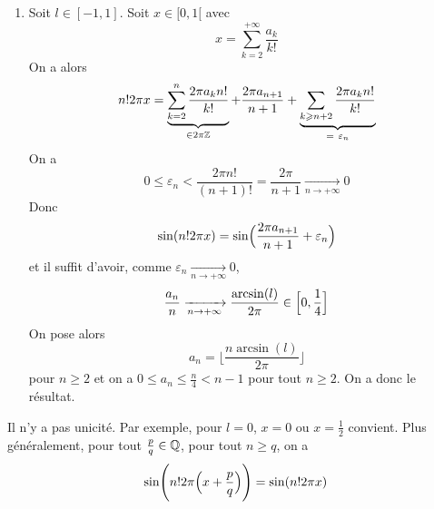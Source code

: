 \begin{solution}
\begin{enumerate}
		\item Soit $l\in[-1,1]$. Soit $x\in[0,1[$ avec 
		$$x=\sum_{k=2}^{+\infty}\frac{a_{k}}{k!}$$
		On a alors 
		$$n!2\pi x=\underbrace{\sum_{k=2}^{n}\frac{2\pi a_{k}n!}{k!}}_{\in 2\pi\mathbb{Z}}+\frac{2\pi a_{n+1}}{n+1}+\underbrace{\sum_{k\geqslant n+2}\frac{2\pi a_{k}n!}{k!}}_{=~\varepsilon_{n}}$$
		On a 
		$$0\leqslant \varepsilon_{n} < \frac{2\pi n!}{(n+1)!}=\frac{2\pi}{n+1}\xrightarrow[n\to+\infty]{}0$$
		Donc 
		$$\sin(n!2\pi x)=\sin\Bigl(\frac{2\pi a_{n+1}}{n+1}+\varepsilon_{n}\Bigr)$$
		et il suffit d'avoir, comme $\varepsilon_{n}\xrightarrow[n\to+\infty]{}0$,
		$$\frac{a_{n}}{n}\xrightarrow[n\to+\infty]{}\frac{\arcsin(l)}{2\pi}\in\Bigl[0,\frac{1}{4}\Bigr]$$
		On pose alors 
		$$\boxed{a_{n}=\Biggl\lfloor\frac{n\arcsin(l)}{2\pi}\Biggr\rfloor}$$
		pour $n\geqslant2$ et on a $0\leqslant a_{n}\leqslant \frac{n}{4}<n-1$ pour tout $n\geqslant2$. On a donc le résultat.
	\end{enumerate}
\end{solution}

\begin{remark}
	Il n'y a pas unicité. Par exemple, pour $l=0$, $x=0$ ou $x=\frac{1}{2}$ convient. Plus généralement, pour tout $\frac{p}{q}\in\mathbb{Q}$, pour tout $n\geqslant q$, on a
	$$\sin\Biggl(n!2\pi\Bigl(x+\frac{p}{q}\Bigr)\Biggr)=\sin(n!2\pi x)$$
\end{remark}

